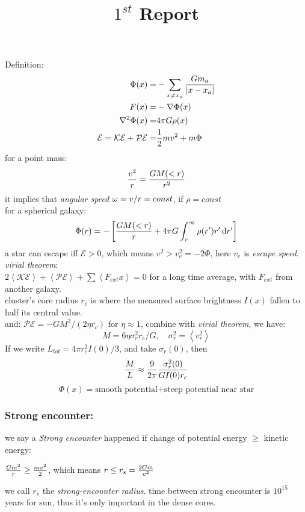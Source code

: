 \documentclass[UTF8,9pt]{ctexart}
\title{$1^{st}$ Report}
\begin{document}
 
\maketitle 
{}
Definition:
$$\begin{aligned} 
    \Phi(x)=&-\sum_{x \neq x_a}\frac{Gm_a}{|x-x_a|}\\
    F(x)=&-\nabla\Phi(x)\\
    \nabla^2\Phi(x)=&4\pi G\rho(x)\\
    \mathcal{E}=\mathcal{KE}+\mathcal{PE }=&\frac{1}{2}mv^2+m\Phi
 \end{aligned}$$
for a point mass:  
$$\frac{v^2}{r}=\frac{GM(<r)}{r^2}$$
it implies that \emph{angular speed} $\omega=v/r=const$, if $\rho=const$\\
for a spherical galaxy:
$$\Phi(r)=-\left[\frac{GM(<r)}{r}+4\pi G\int_r^\infty\rho(r')r'\mathop{}\!\mathrm{d} r'\right]$$
a star can escape iff $\mathcal{E}>0$, which means $v^2>v_e^2=-2\Phi$, here $v_e$ is \emph{escape speed}.\\
\emph{virial theorem}:\\
 $2\left<\mathcal{KE}\right>+\left<\mathcal{PE}\right>+\sum\left<F_{ext}x\right>=0$ for a long time average, with $F_{ext}$ from another galaxy.\\
cluster's core radius $r_c$ is where the measured surface brightness $I(x)$ fallen to half its central value.\\
and: $\mathcal{PE}=-GM^2/(2\eta r_c)$ for $\eta \approx 1$, combine with \emph{virial theorem}, we have:
$$M=6\eta\sigma_r^2r_c/G,\quad \sigma^2_r=\left<v_r^2\right>$$
If we write $L_{tot}=4\pi r_c^2I(0)/3$, and take $\sigma_r(0)$, then
$$\frac{M}{L} \approx \frac{9}{2\pi}\frac{\sigma_r^2(0)}{GI(0)r_c}$$
$$\Phi(x)=\text{smooth potential+steep potential near star}$$
\subsubsection*{Strong encounter:}
we say a \emph{Strong encounter} happened if change of potential energy $\geq$ kinetic energy:
\begin{center}
    $\frac{Gm^2}{r} \geq \frac{mv^2}{2}$, which means $r \leq r_s=\frac{2Gm}{v^2}$\\
\end{center}
we call $r_s$ the \emph{strong-encounter radius}.
time between strong encounter is $10^{15} $ years for sun, thus it's only important in the dense cores.
\end{document}
